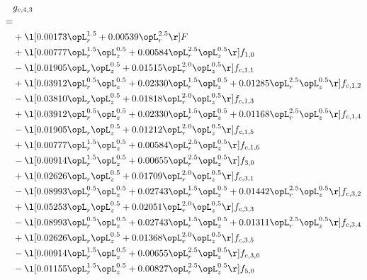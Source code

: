 \begin{alignat}{2} 
\label{eq:g_43_0} 
& g_{c,4,3} \nonumber \\ 
 = \\ 
& + \l[  0.00173 \opL_r^{1.5} +  0.00539 \opL_r^{2.5}  \r] F \nonumber \\ 
& + \l[  0.00777 \opL_r^{1.5} \opL_z^{0.5} +  0.00584 \opL_r^{2.5} \opL_z^{0.5}  \r] f_{1,0} \nonumber \\ 
& - \l[  0.01905 \opL_r \opL_z^{0.5} +  0.01515 \opL_r^{2.0} \opL_z^{0.5}  \r] f_{c,1,1} \nonumber \\ 
& + \l[  0.03912 \opL_r^{0.5} \opL_z^{0.5} +  0.02330 \opL_r^{1.5} \opL_z^{0.5} +  0.01285 \opL_r^{2.5} \opL_z^{0.5}  \r] f_{c,1,2} \nonumber \\ 
& - \l[  0.03810 \opL_r \opL_z^{0.5} +  0.01818 \opL_r^{2.0} \opL_z^{0.5}  \r] f_{c,1,3} \nonumber \\ 
& + \l[  0.03912 \opL_r^{0.5} \opL_z^{0.5} +  0.02330 \opL_r^{1.5} \opL_z^{0.5} +  0.01168 \opL_r^{2.5} \opL_z^{0.5}  \r] f_{c,1,4} \nonumber \\ 
& - \l[  0.01905 \opL_r \opL_z^{0.5} +  0.01212 \opL_r^{2.0} \opL_z^{0.5}  \r] f_{c,1,5} \nonumber \\ 
& + \l[  0.00777 \opL_r^{1.5} \opL_z^{0.5} +  0.00584 \opL_r^{2.5} \opL_z^{0.5}  \r] f_{c,1,6} \nonumber \\ 
& - \l[  0.00914 \opL_r^{1.5} \opL_z^{0.5} +  0.00655 \opL_r^{2.5} \opL_z^{0.5}  \r] f_{3,0} \nonumber \\ 
& + \l[  0.02626 \opL_r \opL_z^{0.5} +  0.01709 \opL_r^{2.0} \opL_z^{0.5}  \r] f_{c,3,1} \nonumber \\ 
& - \l[  0.08993 \opL_r^{0.5} \opL_z^{0.5} +  0.02743 \opL_r^{1.5} \opL_z^{0.5} +  0.01442 \opL_r^{2.5} \opL_z^{0.5}  \r] f_{c,3,2} \nonumber \\ 
& + \l[  0.05253 \opL_r \opL_z^{0.5} +  0.02051 \opL_r^{2.0} \opL_z^{0.5}  \r] f_{c,3,3} \nonumber \\ 
& - \l[  0.08993 \opL_r^{0.5} \opL_z^{0.5} +  0.02743 \opL_r^{1.5} \opL_z^{0.5} +  0.01311 \opL_r^{2.5} \opL_z^{0.5}  \r] f_{c,3,4} \nonumber \\ 
& + \l[  0.02626 \opL_r \opL_z^{0.5} +  0.01368 \opL_r^{2.0} \opL_z^{0.5}  \r] f_{c,3,5} \nonumber \\ 
& - \l[  0.00914 \opL_r^{1.5} \opL_z^{0.5} +  0.00655 \opL_r^{2.5} \opL_z^{0.5}  \r] f_{c,3,6} \nonumber \\ 
& - \l[  0.01155 \opL_r^{1.5} \opL_z^{0.5} +  0.00827 \opL_r^{2.5} \opL_z^{0.5}  \r] f_{5,0} \nonumber \\ 

\end{alignat}
